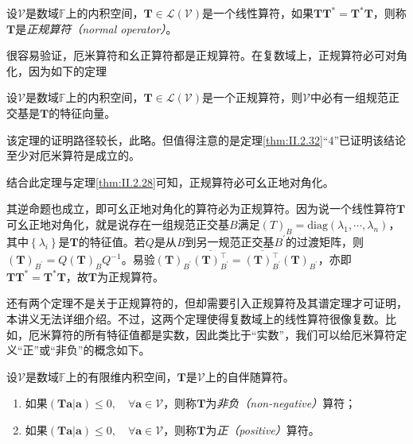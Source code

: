 \documentclass[main.tex]{subfiles}
\begin{document}
\begin{definition}[正规算符]\label{def:II.2.24}
    设$\mathcal{V}$是数域$\mathbb{F}$上的内积空间，$\mathbf{T}\in\mathcal{L}\left(\mathcal{V}\right)$是一个线性算符，如果$\mathbf{TT}^*=\mathbf{T}^*\mathbf{T}$，则称$\mathbf{T}$是\emph{正规算符（normal operator）}。
\end{definition}

很容易验证，厄米算符和幺正算符都是正规算符。在复数域上，正规算符必可对角化，因为如下的定理

\begin{theorem}\label{thm:II.2.35}
    设$\mathcal{V}$是数域$\mathbb{F}$上的内积空间，$\mathbf{T}\in\mathcal{L}\left(\mathcal{V}\right)$是一个正规算符，则$\mathcal{V}$中必有一组规范正交基是$\mathbf{T}$的特征向量。
\end{theorem}

该定理的证明路径较长，此略\cite[\S 8.5 Theorem 22]{Hoffman1971}。但值得注意的是定理\ref{thm:II.2.32}“4”已证明该结论至少对厄米算符是成立的。

结合此定理与定理\ref{thm:II.2.28}可知，正规算符必可幺正地对角化。

其逆命题也成立，即可幺正地对角化的算符必为正规算符。因为说一个线性算符$\mathbf{T}$可幺正地对角化，就是说存在一组规范正交基$B$满足$\left(T\right)_B=\mathrm{diag}\left(\lambda_1,\cdots,\lambda_n\right)$，其中$\left\{\lambda_i\right\}$是$\mathbf{T}$的特征值。若$Q$是从$B$到另一规范正交基$B^\prime$的过渡矩阵，则$\left(\mathbf{T}\right)_{B^\prime}=Q\left(\mathbf{T}\right)_{B}Q^{-1}$。易验$\left(\mathbf{T}\right)_{B^\prime}\overline{\left(\mathbf{T}\right)^\intercal_{B^\prime}}=\overline{\left(\mathbf{T}\right)^\intercal_{B^\prime}}\left(\mathbf{T}\right)_{B^\prime}$，亦即$\mathbf{TT}^*=\mathbf{T}^*\mathbf{T}$，故$\mathbf{T}$为正规算符。

还有两个定理不是关于正规算符的，但却需要引入正规算符及其谱定理才可证明，本讲义无法详细介绍。不过，这两个定理使得复数域上的线性算符很像复数。比如，厄米算符的所有特征值都是实数，因此类比于“实数”，我们可以给厄米算符定义“正”或“非负”的概念如下。

\begin{definition}\label{def:II.2.25}
    设$\mathcal{V}$是数域$\mathbb{F}$上的有限维内积空间，$\mathbf{T}$是$\mathcal{V}$上的自伴随算符。
    \begin{enumerate}
        \item 如果$\left(\mathbf{Ta}|\mathbf{a}\right)\leq 0,\quad\forall\mathbf{a}\in\mathcal{V}$，则称$\mathbf{T}$为\emph{非负（non-negative）}算符；
        \item 如果$\left(\mathbf{Ta}|\mathbf{a}\right)\leq 0,\quad\forall\mathbf{a}\in\mathcal{V}$，则称$\mathbf{T}$为\emph{正（positive）}算符。
    \end{enumerate}
\end{definition}
\end{document}
